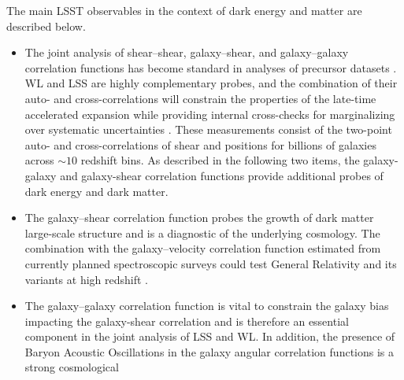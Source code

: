 The main LSST observables in the context of dark energy and matter are described below.

\begin{itemize}
\item The
joint analysis of shear--shear, galaxy--shear, and galaxy--galaxy
correlation functions has become standard in analyses of precursor datasets
\cite[e.g.][]{2017arXiv170801530D,2018MNRAS.474.4894J}. WL and LSS are highly complementary probes, and the combination
of their auto- and cross-correlations will constrain the properties of the late-time accelerated expansion while providing
internal cross-checks for marginalizing over systematic uncertainties \cite[e.g.,][]{2017arXiv171003235M}.
These measurements consist of the two-point auto- and cross-correlations of shear and positions for billions of galaxies across $\sim 10$ redshift bins.
As described in the following two items, the galaxy-galaxy and galaxy-shear correlation functions provide additional probes of dark energy and dark matter.
%
%
\item The galaxy--shear correlation function probes the growth of dark matter large-scale structure and is a
diagnostic of the underlying cosmology. The combination with the
galaxy--velocity correlation function estimated from currently planned
spectroscopic surveys
could test General Relativity and its variants at high redshift \citep{2010Natur.464..256R}.
%
\item The galaxy--galaxy correlation function is vital to constrain the galaxy bias impacting the galaxy-shear correlation and is therefore
an essential component in the joint analysis of LSS and WL. In addition, the presence of
Baryon Acoustic Oscillations in the galaxy angular correlation functions is a strong cosmological

\end{itemize}

